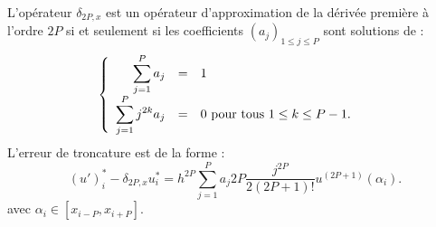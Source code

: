 \begin{theoreme}
L'opérateur $\delta_{2P,x}$ est un opérateur d'approximation de la dérivée première à l'ordre $2P$ si et seulement si les coefficients $(a_j)_{1 \leq j \leq P}$ sont solutions de :
\begin{equation}
\left\lbrace
\begin{array}{rcll}
\displaystyle\sum\limits_{j=1}^P a_j & = & 1 & \\
\displaystyle\sum\limits_{j=1}^P j^{2k} a_j & = & 0 \text{ pour tous } 1 \leq k \leq P-1.
\end{array}
\right.
\label{eq:syst_opexplicite_P}
\end{equation}
L'erreur de troncature est de la forme :
\begin{equation}
\left(u' \right)_i^* - \delta_{2P,x} u^*_i = h^{2P}\sum_{j=1}^P a_j 2P \dfrac{j^{2P}}{2(2P+1)!} u^{(2P+1)}(\alpha_i) .
\end{equation}
avec $\alpha_i \in [x_{i-P}, x_{i+P}]$.
\label{th:consistance_delta_x_explicite}
\end{theoreme}

